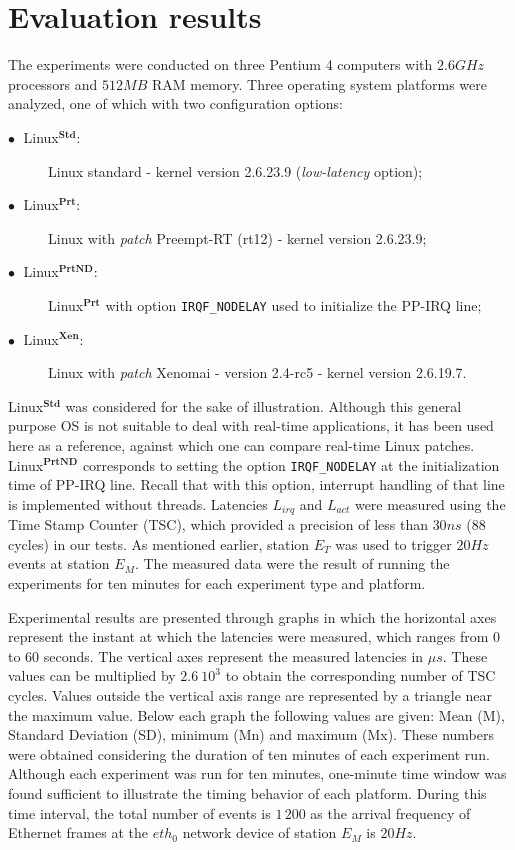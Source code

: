 \documentclass{acm_proc_article-sp}
\newcommand{\cod}[1]{\hspace{0.1cm}\texttt{#1}}
\newcommand{\ing}[1]{\emph{#1}}
\newcommand{\preemptt}{{Preempt-RT }}
\begin{document}
\section{Evaluation results}
\label{cap:platEstud}

The experiments were conducted on three Pentium 4 computers with $2.6 GHz$
processors and $512 MB$ RAM memory. Three operating system platforms were analyzed,
one of which with two configuration options:

\begin{description}
\item[$\bullet \;$ Linux$^{\mathbf{Std}}$:] Linux standard - kernel version 2.6.23.9
  (\ing{low-latency} option);
\item[$\bullet \;$ Linux$^{\mathbf{Prt}}$:] Linux with \ing{patch}
  \preemptt (rt12) - kernel version 2.6.23.9;
\item[$\bullet \;$ Linux$^{\mathbf{PrtND}}$:] Linux$^{\mathbf{Prt}}$ with option
  \cod{IRQF\_NODELAY} used to initialize the PP-IRQ line;
\item[$\bullet \;$ Linux$^{\mathbf{Xen}}$:] Linux with \ing{patch} Xenomai - version
  2.4-rc5 - kernel version 2.6.19.7.
\end{description}

Linux$^{\mathbf{Std}}$ was considered for the sake of illustration. Although this
general purpose OS is not suitable to deal with real-time applications, it has been
used here as a reference, against which one can compare real-time Linux
patches. Linux$^{\mathbf{PrtND}}$ corresponds to setting the option
\cod{IRQF\_NODELAY} at the initialization time of PP-IRQ line. Recall that with this
option, interrupt handling of that line is implemented without threads.  Latencies
$L_{irq}$ and $L_{act}$ were measured using the Time Stamp Counter (TSC), which
provided a precision of less than $30 ns$ (88 cycles) in our tests.  As mentioned
earlier, station $E_T$ was used to trigger $20Hz$ events at station $E_M$.  The
measured data were the result of running the experiments for ten minutes for each
experiment type and platform.

Experimental results are presented through graphs in which the horizontal axes
represent the instant at which the latencies were measured, which ranges from 0 to
60 seconds.  The vertical axes represent the measured latencies in $\mu s$. These
values can be multiplied by $2.6\:10^3$ to obtain the corresponding number of TSC
cycles.  Values outside the vertical axis range are represented by a triangle near
the maximum value.  Below each graph the following values are given: Mean (M),
Standard Deviation (SD), minimum (Mn) and maximum (Mx). These numbers were obtained
considering the duration of ten minutes of each experiment run. Although each
experiment was run for ten minutes, one-minute time window was found sufficient to
illustrate the timing behavior of each platform.  During this time interval, the
total number of events is $1\,200$ as the arrival frequency of Ethernet frames at the
$eth_0$ network device of station $E_M$ is $20 Hz$.
\end{document}
